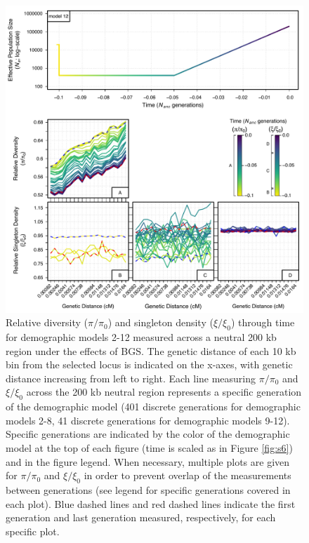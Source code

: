 \documentclass[9pt,twocolumn,twoside]{rilabRxiv}
\begin{document}
\begin{figure}[htb]
      \centering
      \includegraphics[width=\linewidth]{figures/FigS20.pdf}
      \caption{Relative diversity ($\pi/\pi_0$) and singleton density ($\xi/\xi_0$) through time for demographic models 2-12 measured across a neutral 200 kb region under the effects of BGS.
The genetic distance of each 10 kb bin from the selected locus is indicated on the x-axes, with genetic distance increasing from left to right.
Each line measuring $\pi/\pi_0$ and $\xi/\xi_0$ across the 200 kb neutral region represents a specific generation of the demographic model (401 discrete generations for demographic models 2-8, 41 discrete generations for demographic models 9-12).
Specific generations are indicated by the color of the demographic model at the top of each figure (time is scaled as in Figure \ref{fig:s6}) and in the figure legend.
When necessary, multiple plots are given for $\pi/\pi_0$ and $\xi/\xi_0$ in order to prevent overlap of the measurements between generations (see legend for specific generations covered in each plot).
Blue dashed lines and red dashed lines indicate the first generation and last generation measured, respectively, for each specific plot.}
\label{fig:all200}
\end{figure}
\pagebreak
\end{document}
